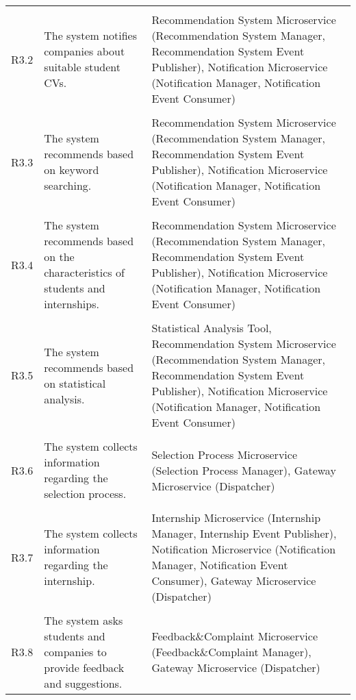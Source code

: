 \begin{longtable}{p{}p{}p{}}
    \vspace{0.5em}\\
    R3.2 &
    The system notifies companies about suitable student CVs. &
    Recommendation System Microservice (Recommendation System Manager, Recommendation System Event Publisher), Notification Microservice (Notification Manager, Notification Event Consumer) \\
    \vspace{0.5em}\\
    R3.3 &
    The system recommends based on keyword searching. &
    Recommendation System Microservice (Recommendation System Manager, Recommendation System Event Publisher), Notification Microservice (Notification Manager, Notification Event Consumer) \\
    \vspace{0.5em}\\
    R3.4 &
    The system recommends based on the characteristics of students and internships. &
    Recommendation System Microservice (Recommendation System Manager, Recommendation System Event Publisher), Notification Microservice (Notification Manager, Notification Event Consumer) \\
    \vspace{0.5em}\\
    R3.5 &
    The system recommends based on statistical analysis. &
    Statistical Analysis Tool, Recommendation System Microservice (Recommendation System Manager, Recommendation System Event Publisher), Notification Microservice (Notification Manager, Notification Event Consumer) \\
    \vspace{0.5em}\\
    R3.6 &
    The system collects information regarding the selection process. &
    Selection Process Microservice (Selection Process Manager), Gateway Microservice (Dispatcher) \\
    \vspace{0.5em}\\
    R3.7 &
    The system collects information regarding the internship. &
    Internship Microservice (Internship Manager, Internship Event Publisher), Notification Microservice (Notification Manager, Notification Event Consumer), Gateway Microservice (Dispatcher) \\
    \vspace{0.5em}\\
    R3.8 &
    The system asks students and companies to provide feedback and suggestions. &
    Feedback\&Complaint Microservice (Feedback\&Complaint Manager), Gateway Microservice (Dispatcher) \\

\end{longtable}
